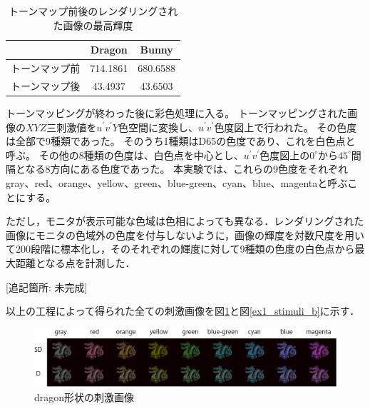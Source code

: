                 \begin{table}[h]
                    \centering
                    \caption{トーンマップ前後のレンダリングされた画像の最高輝度}
                    \begin{tabular}{|l||c|c|} \hline
                                               & Dragon              & Bunny              \\ \hline \hline
                        トーンマップ前         & 714.1861            & 680.6588           \\ \hline
                        トーンマップ後         & 43.4937             & 43.6503            \\ \hline
                    \end{tabular}
                    \label{tonemap}
                \end{table}

                トーンマッピングが終わった後に彩色処理に入る。
                トーンマッピングされた画像の$XYZ$三刺激値を$u^{\prime}v^{\prime}Y$色空間に変換し、$u^{\prime}v^{\prime}$色度図上で行われた。
                その色度は全部で9種類であった。
                そのうち1種類はD65の色度であり、これを白色点と呼ぶ。
                その他の8種類の色度は、白色点を中心とし、$u^{\prime}v^{\prime}$色度図上の$0^{\circ}$から$45^{\circ}$間隔となる8方向にある色度であった。
                本実験では、これらの9色度をそれぞれgray、red、orange、yellow、green、blue-green、cyan、blue、magentaと呼ぶことにする。

                ただし，モニタが表示可能な色域は色相によっても異なる．レンダリングされた画像にモニタの色域外の色度を付与しないように，画像の輝度を対数尺度を用いて200段階に標本化し，そのそれぞれの輝度に対して9種類の色度の白色点から最大距離となる点を計測した．

                [追記箇所: 未完成]

                
            以上の工程によって得られた全ての刺激画像を図\ref{ex1_stimuli_d}と図\ref{ex1_stimuli_b}に示す．

            \begin{figure}[h]
                \centering
                \includegraphics[width=14.0cm]{./img/ex1_stimuli_d_p.png}
                \caption{dragon形状の刺激画像}
                \label{ex1_stimuli_d}
            \end{figure}

